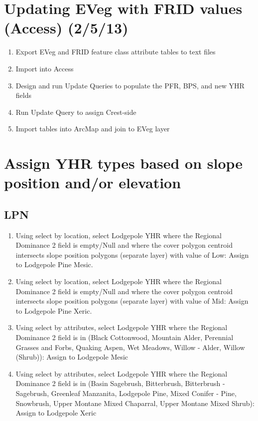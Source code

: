 \section{Updating EVeg with FRID values (Access) (2/5/13)}
\begin{enumerate}
\item Export EVeg and FRID feature class attribute tables to text files
\item Import into Access
\item Design and run Update Queries to populate the PFR, BPS, and new YHR fields
\item Run Update Query to assign Crest-side
\item Import tables into ArcMap and join to EVeg layer
\end{enumerate}

\section{Assign YHR types based on slope position and/or elevation}
\subsection{LPN}
\begin{enumerate}
\item Using select by location, select Lodgepole YHR where the Regional Dominance 2 field is empty/Null and where the cover polygon centroid intersects slope position polygons (separate layer) with value of Low: Assign to Lodgepole Pine Mesic.
\item Using select by location, select Lodgepole YHR where the Regional Dominance 2 field is empty/Null and where the cover polygon centroid intersects slope position polygons (separate layer) with value of Mid: Assign to Lodgepole Pine Xeric.
\item Using select by attributes, select Lodgepole YHR where the Regional Dominance 2 field is in (Black Cottonwood, Mountain Alder, Perennial Grasses and Forbs, Quaking Aspen, Wet Meadows, Willow - Alder, Willow (Shrub)): Assign to Lodgepole Mesic
\item Using select by attributes, select Lodgepole YHR where the Regional Dominance 2 field is in (Basin Sagebrush, Bitterbrush, Bitterbrush - Sagebrush, Greenleaf Manzanita, Lodgepole Pine, Mixed Conifer - Pine, Snowbrush, Upper Montane Mixed Chaparral, Upper Montane Mixed Shrub): Assign to Lodgepole Xeric
\end{enumerate}

